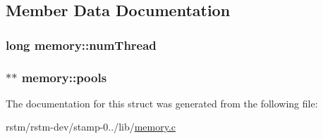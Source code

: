 \subsection{Member Data Documentation}
\hypertarget{structmemory_abefc048307c14ed9c9dea0f0f11307df}{
\subsubsection[{num\-Thread}]{\setlength{\rightskip}{0pt plus 5cm}long memory\-::num\-Thread}}\label{structmemory_abefc048307c14ed9c9dea0f0f11307df}
\hypertarget{structmemory_ae6373eeee48d33f4b92cef542c2adf90}{
\subsubsection[{pools}]{$\ast$$\ast$ memory\-::pools}}\label{structmemory_ae6373eeee48d33f4b92cef542c2adf90}


The documentation for this struct was generated from the following file\-:\begin{DoxyCompactItemize}
\item 
rstm/rstm-\/dev/stamp-\/0../lib/\hyperlink{memory_8c}{memory.\-c}\end{DoxyCompactItemize}
